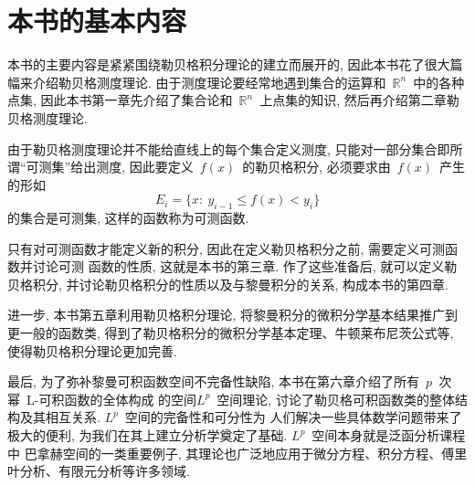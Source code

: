 \medskip

\section{本书的基本内容}

\qquad 本书的主要内容是紧紧围绕勒贝格积分理论的建立而展开的, 因此本书花了很大篇幅来介绍勒贝格测度理论.
由于测度理论要经常地遇到集合的运算和~$\mathbb{R}^n$~中的各种点集,  因此本书第一章先介绍了集合论和~$\mathbb{R}^n$~上点集的知识, 然后再介绍第二章勒贝格测度理论.

由于勒贝格测度理论并不能给直线上的每个集合定义测度, 只能对一部分集合即所谓``可测集''给出测度, 因此要定义~$f(x)$~的勒贝格积分, 必须要求由~$f(x)$~产生的形如
\[
E_i = \big\{ x: \: y_{i-1} \leqslant f(x) < y_i \big\}
\]
的集合是可测集, 这样的函数称为可测函数.

只有对可测函数才能定义新的积分, 因此在定义勒贝格积分之前, 需要定义可测函数并讨论可测
函数的性质, 这就是本书的第三章. 作了这些准备后, 就可以定义勒贝格积分,
并讨论勒贝格积分的性质以及与黎曼积分的关系, 构成本书的第四章.

进一步, 本书第五章利用勒贝格积分理论, 将黎曼积分的微积分学基本结果推广到更一般的函数类,
得到了勒贝格积分的微积分学基本定理、牛顿\raisebox{0.5mm}{--}莱布尼茨公式等, 使得勒贝格积分理论更加完善.

最后, 为了弥补黎曼可积函数空间不完备性缺陷, 本书在第六章介绍了所有~$p$~次幂~L-可积函数的全体构成
的空间\raisebox{0.5mm}{-----}$L^p$~空间理论, 讨论了勒贝格可积函数类的整体结构及其相互关系. $L^p$~空间的完备性和可分性为
人们解决一些具体数学问题带来了极大的便利, 为我们在其上建立分析学奠定了基础.
$L^p$~空间本身就是泛函分析课程中
巴拿赫空间的一类重要例子, 其理论也广泛地应用于微分方程、积分方程、傅里叶分析、有限元分析等许多领域.

